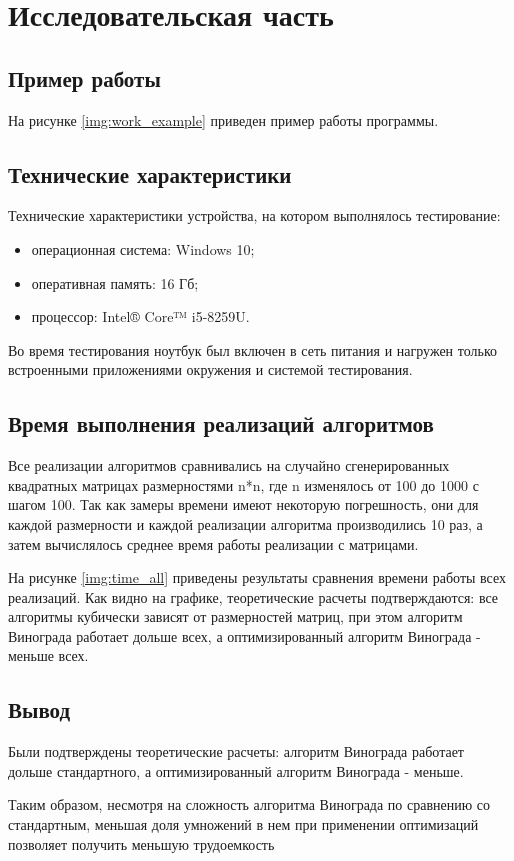 \chapter{Исследовательская часть}

\section{Пример работы}

На рисунке \ref{img:work_example} приведен пример работы программы.


\section{Технические характеристики}

Технические характеристики устройства, на котором выполнялось тестирование:

\begin{itemize}
	\item операционная система: Windows 10;
	\item оперативная память: 16 Гб;
	\item процессор: Intel® Core™ i5-8259U.
\end{itemize}

Во время тестирования ноутбук был включен в сеть питания и нагружен только встроенными приложениями окружения и системой тестирования.

\section{Время выполнения реализаций алгоритмов}

 Все реализации алгоритмов сравнивались на случайно сгенерированных квадратных матрицах размерностями n*n, где n изменялось от 100 до 1000 с шагом 100. Так как замеры времени имеют некоторую погрешность, они для каждой размерности и каждой реализации алгоритма производились 10 раз, а затем вычислялось среднее время работы реализации с матрицами.
 
На рисунке \ref{img:time_all} приведены результаты сравнения времени работы всех реализаций. Как видно на графике, теоретические расчеты подтверждаются: все алгоритмы кубически зависят от размерностей матриц, при этом алгоритм Винограда работает дольше всех, а оптимизированный алгоритм Винограда - меньше всех.




\section*{Вывод}

Были подтверждены теоретические расчеты: алгоритм Винограда работает дольше стандартного, а оптимизированный алгоритм Винограда - меньше.
 
Таким образом, несмотря на сложность алгоритма Винограда по сравнению со стандартным, меньшая доля умножений в нем при применении оптимизаций позволяет получить меньшую трудоемкость

